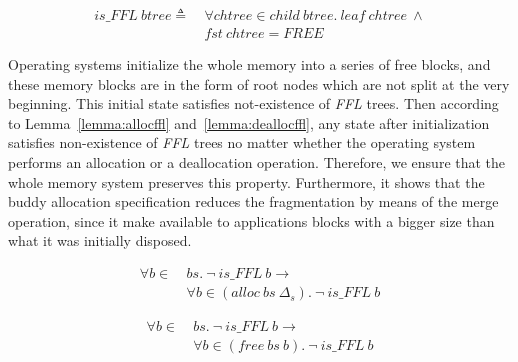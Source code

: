 \begin{definition} 
\label{def:FF4}
\end{definition}
\vspace{-19pt}
\begin{align*}
is\_FFL\ btree \triangleq\ &\forall chtree \in child\ btree.\ leaf\ chtree\ \wedge \\
&fst\ chtree = FREE
\end{align*}
\vspace{-12pt}

Operating systems initialize the whole memory into a series of free blocks, and these memory blocks are in the form of root nodes which are not split at the very beginning. This initial state satisfies not-existence of \emph{FFL} trees. Then according to Lemma~\ref{lemma:allocffl} and~\ref{lemma:deallocffl}, any state after initialization satisfies non-existence of \emph{FFL} trees no matter whether the operating system performs an allocation or a deallocation operation. Therefore, we ensure that the whole memory system preserves this property. Furthermore, it shows that the buddy allocation specification reduces the fragmentation by means of the merge operation, since it make available to applications blocks with a bigger size than what it was initially disposed.

\begin{lemma} 
\label{lemma:allocffl}
\begin{align*}
\forall b \in\ &bs.\ \neg\ is\_FFL\ b \longrightarrow \\
&\forall b \in (alloc\ bs\ \Delta_s).\ \neg\ is\_FFL\ b
\end{align*}
\end{lemma}

\begin{lemma} 
\label{lemma:deallocffl}
\begin{align*}
\forall b \in\ &bs.\ \neg\ is\_FFL\ b \longrightarrow \\
&\forall b \in (free\ bs\ b).\ \neg\ is\_FFL\ b
\end{align*}
\end{lemma}

%

